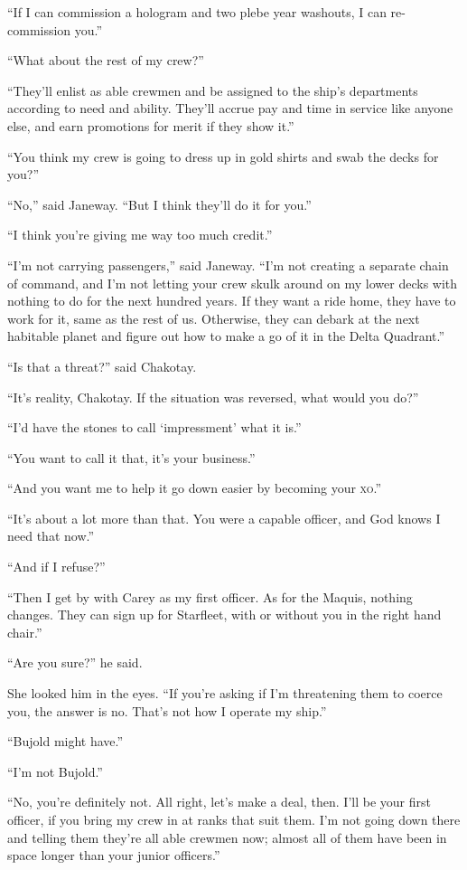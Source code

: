 \documentclass[twoside,letterpaper,12pt]{memoir}
\begin{document}
``If I can commission a hologram and two plebe year washouts, I can re-commission you.'' 

``What about the rest of my crew?'' 

``They’ll enlist as able crewmen and be assigned to the ship’s departments according to need and ability. They’ll accrue pay and time in service like anyone else, and earn promotions for merit if they show it.'' 

``You think my crew is going to dress up in gold shirts and swab the decks for you?'' 

``No,'' said Janeway. ``But I think they’ll do it for you.'' 

``I think you’re giving me way too much credit.'' 

``I’m not carrying passengers,'' said Janeway. ``I’m not creating a separate chain of command, and I’m not letting your crew skulk around on my lower decks with nothing to do for the next hundred years. If they want a ride home, they have to work for it, same as the rest of us. Otherwise, they can debark at the next habitable planet and figure out how to make a go of it in the Delta Quadrant.'' 

``Is that a threat?'' said Chakotay. 

``It’s reality, Chakotay. If the situation was reversed, what would you do?'' 

``I’d have the stones to call ‘impressment’ what it is.'' 

``You want to call it that, it’s your business.'' 

``And you want me to help it go down easier by becoming your \textsc{xo}.'' 

``It’s about a lot more than that. You were a capable officer, and God knows I need that now.'' 

``And if I refuse?'' 

``Then I get by with Carey as my first officer. As for the Maquis, nothing changes. They can sign up for Starfleet, with or without you in the right hand chair.'' 

``Are you sure?'' he said. 

She looked him in the eyes. ``If you’re asking if I’m threatening them to coerce you, the answer is no. That’s not how I operate my ship.'' 

``Bujold might have.'' 

``I’m not Bujold.'' 

``No, you’re definitely not. All right, let’s make a deal, then. I’ll be your first officer, if you bring my crew in at ranks that suit them. I’m not going down there and telling them they’re all able crewmen now; almost all of them have been in space longer than your junior officers.'' 
\end{document}
